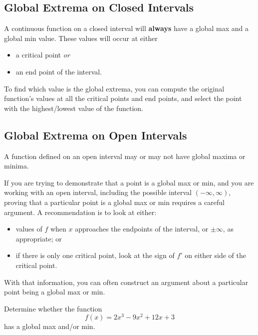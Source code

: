 \begin{boxnote}
\subsection*{Global Extrema on Closed Intervals}

A continuous function on a closed interval will {\bf always} have a
global max and a global min value.  These values will occur at either
\begin{itemize}
\item a critical point {\em or}
\item an end point of the interval.
\end{itemize}
To find which value is the global extrema, you can compute the
original function's values at all the critical points and end points,
and select the point with the highest/lowest value of the function.

\end{boxnote}


\newpage
\begin{boxnote}
\subsection*{Global Extrema on Open Intervals}

A function defined on an open interval may or may not have global
maxima or minima.  
\vsc

If you are trying to demonstrate that a point is a global max or min,
and you are working with an open interval, including the possible
interval $(-\infty, \infty)$, proving that a particular point is a global
max or min requires a careful argument.  A recommendation is to look
at either:
\begin{itemize}
\item values of $f$ when $x$ approaches the endpoints of the interval,
  or $\pm \infty$, as appropriate; or
\item if there is only one critical point, look at the sign of $f'$ on
  either side of the critical point.
\end{itemize}
With that information, you can often construct an argument about a
particular point being a global max or min.

\end{boxnote}

\newpage

\problem Determine whether the function
$$f(x) = 2 x^3 - 9 x^2 + 12 x +3$$ has a global max and/or min.

